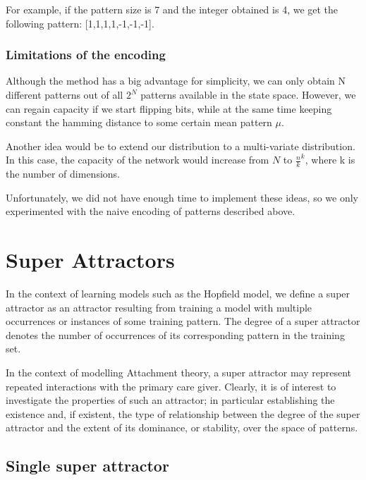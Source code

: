 For example, if the pattern size is 7 and the integer obtained is 4, we get the following pattern: [1,1,1,1,-1,-1,-1].

\subsubsection{Limitations of the encoding}

Although the method has a big advantage for simplicity, we can only obtain N different patterns out of all \( 2^N\) patterns available in the state space. However, we can regain capacity if we start flipping bits, while at the same time keeping constant the hamming distance to some certain mean pattern \(\mu\).

Another idea would be to extend our distribution to a multi-variate distribution. In this case, the capacity of the network would increase from \(N\) to \(\frac{n}{k}^k\), where k is the number of dimensions.

Unfortunately, we did not have enough time to implement these ideas, so we only experimented with the naive encoding of patterns described above.

\section{Super Attractors}
In the context of learning models such as the Hopfield model, we define a super attractor as an attractor resulting from training a model with multiple occurrences or instances of some training pattern. The degree of a super attractor denotes the number of occurrences of its corresponding pattern in the training set.


In the context of modelling Attachment theory, a super attractor may represent repeated interactions with the primary care giver. Clearly, it is of interest to investigate the properties of such an attractor; in particular establishing the existence and, if existent, the type of relationship between the degree of the super attractor and the extent of its dominance, or stability, over the space of patterns.


\subsection{Single super attractor}

\newcommand{\psuper}{$p_{super}$}
\newcommand{\prandom}{$\overrightarrow{p}_{random}$}


